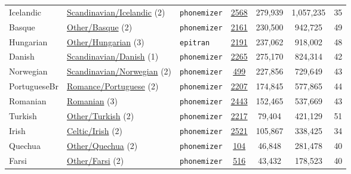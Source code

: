 \begin{table}[t]
\begin{tabular}{lllcccc}
        Icelandic & \href{https://childes.talkbank.org/access/scandinavian}{Scandinavian/Icelandic} (2) & \texttt{phonemizer} & \href{https://phoible.org/inventories/view/2568}{2568} & 279,939 & 1,057,235 & 35 \\
        Basque & \href{https://childes.talkbank.org/access/other}{Other/Basque} (2) & \texttt{phonemizer} & \href{https://phoible.org/inventories/view/2161}{2161} & 230,500 & 942,725 & 49 \\
        Hungarian & \href{https://childes.talkbank.org/access/other}{Other/Hungarian} (3) & \texttt{epitran} & \href{https://phoible.org/inventories/view/2191}{2191} & 237,062 & 918,002 & 48 \\
        Danish & \href{https://childes.talkbank.org/access/scandinavian}{Scandinavian/Danish} (1) & \texttt{phonemizer} & \href{https://phoible.org/inventories/view/2265}{2265} & 275,170 & 824,314 & 42 \\
        Norwegian & \href{https://childes.talkbank.org/access/scandinavian}{Scandinavian/Norwegian} (2) & \texttt{phonemizer} & \href{https://phoible.org/inventories/view/499}{499} & 227,856 & 729,649 & 43 \\
        PortugueseBr & \href{https://childes.talkbank.org/access/romance}{Romance/Portuguese} (2) & \texttt{phonemizer} & \href{https://phoible.org/inventories/view/2207}{2207} & 174,845 & 577,865 & 44 \\
        Romanian & \href{https://childes.talkbank.org/access/romanian}{Romanian} (3) & \texttt{phonemizer} & \href{https://phoible.org/inventories/view/2443}{2443} & 152,465 & 537,669 & 43 \\
        Turkish & \href{https://childes.talkbank.org/access/other}{Other/Turkish} (2) & \texttt{phonemizer} & \href{https://phoible.org/inventories/view/2217}{2217} & 79,404 & 421,129 & 51 \\
        Irish & \href{https://childes.talkbank.org/access/celtic}{Celtic/Irish} (2) & \texttt{phonemizer} & \href{https://phoible.org/inventories/view/2521}{2521} & 105,867 & 338,425 & 34 \\
        Quechua & \href{https://childes.talkbank.org/access/other}{Other/Quechua} (2) & \texttt{phonemizer} & \href{https://phoible.org/inventories/view/104}{104} & 46,848 & 281,478 & 40 \\
        Farsi & \href{https://childes.talkbank.org/access/other}{Other/Farsi} (2) & \texttt{phonemizer} & \href{https://phoible.org/inventories/view/516}{516} & 43,432 & 178,523 & 40 \\

\end{tabular}
\end{table}
